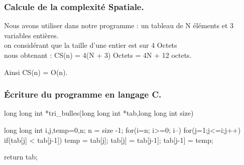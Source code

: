 \documentclass[12pt]{article}
\begin{document}
\subsubsection{Calcule de la complexité Spatiale.}
Nous avons utiliser dans notre programme : un tableau de N éléments et 3 variables entières.\\
on considérant que la taille d'une entier est sur 4 Octets \\

nous obtenant :
\color{blue} CS(n) = 4(N + 3) Octets = 4N + 12 octets.
\color{black}
	
	Ainsi 
	\color{blue}
	CS(n) = O(n).
	\color{black}


\subsubsection{Écriture du programme en langage C.}
\begin{sql}
long long int *tri_bulles(long long int *tab,long long int size)
{
  long long int i,j,temp=0,n;
  n = size -1;
  for(i=n; i>=0; i--)
  {
    for(j=1;j<=i;j++)
    {
      if(tab[j] < tab[j-1])
      {
        temp = tab[j];
        tab[j] = tab[j-1];
        tab[j-1] = temp;
      }
    }
  }

  return tab;
}
\end{sql}
\end{document}
